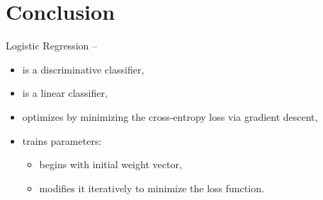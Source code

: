 \documentclass[
	number={4},
	title={Logistic Regression}
]{cs584notes}
\begin{document}
\section{Conclusion}\label{sec:conclusion-4}
Logistic Regression --
\begin{itemize}
	\item is a discriminative classifier,
	\item is a linear classifier,
	\item optimizes by minimizing the cross-entropy loss via gradient descent,
	\item trains parameters:
	\begin{itemize}
		\item begins with initial weight vector,
		\item modifies it iteratively to minimize the loss function.
	\end{itemize}
\end{itemize}
\end{document}
